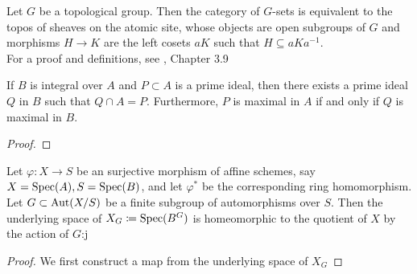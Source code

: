 \begin{theorem}
	Let $G$ be a topological group. Then the category of $G$-sets is equivalent to the topos of sheaves on the atomic site, whose objects are open subgroups of $G$ and morphisms $H \to K$ are the left cosets $aK$ such that $H \subseteq aKa^{-1}$.\\
	For a proof and definitions, see \cite{SIGL}, Chapter 3.9
\end{theorem}

\begin{lemma}
	If $B$ is integral over $A$ and $P \subset A$ is a prime ideal, then there exists a prime ideal $Q$ in $B$ such that $Q \cap A = P$. Furthermore, $P$ is maximal in $A$ if and only if $Q$ is maximal in $B$.
\end{lemma}

\begin{proof}

\end{proof}

\begin{construction}
	Let $\varphi \colon X \to S$ be an surjective morphism of affine schemes, say $X = \operatorname{Spec}(A), S = \operatorname{Spec}(B)$, and let $\varphi^*$ be the corresponding ring homomorphism. Let $G \subset \operatorname{Aut}(X/S)$ be a finite subgroup of automorphisms over $S$. Then the underlying space of $X_G \coloneqq \operatorname{Spec}(B^G)$ is homeomorphic to the quotient of $X$ by the action of $G$:j
\end{construction}

\begin{proof}
	We first construct a map from the underlying space of $X_G$
\end{proof}
